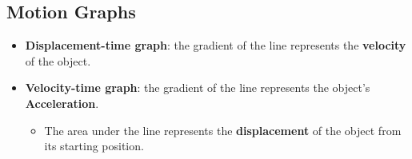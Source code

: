 \subsection{Motion Graphs}

\begin{itemize}
    \item \textbf{Displacement-time graph}: the gradient of the line represents the \textbf{velocity} of the object.
    \item \textbf{Velocity-time graph}: the gradient of the line represents the object's \textbf{Acceleration}.
        \begin{itemize}
            \item The area under the line represents the \textbf{displacement} of the object from its starting position.
        \end{itemize}
\end{itemize}
